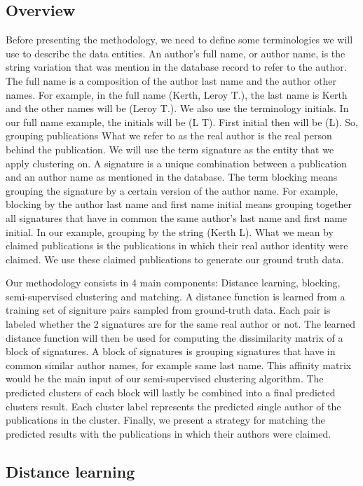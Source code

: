 \documentclass{article}
\begin{document}
\subsection{Overview}
Before presenting the methodology, we need to define some terminologies we will use to describe the data entities. An author's full name, or author name, is the string variation that was mention in the database record to refer to the author. The full name is a composition of the author last name and the author other names. For example, in the full name (Kerth, Leroy T.), the last name is Kerth and the other names will be (Leroy T.). We also use the terminology initials. In our full name example, the initials will be (L T). First initial then will be (L). So, grouping publications  What we refer to as the real author is the real person behind the publication. We will use the term signature as the entity that we apply clustering on.  A signature is a unique combination between a publication and an author name as mentioned in the database. The term blocking means grouping the signature by a certain version of the author name. For example, blocking by the author last name and first name initial means grouping together all signatures that have in common the same author's last name and first name initial. In our example, grouping by the string (Kerth L). What we mean by claimed publications is the publications in which their real author identity were claimed. We use these claimed publications to generate our ground truth data.

Our methodology consists in 4 main components: Distance learning, blocking, semi-supervised clustering and matching. A distance function is learned from a training set of signiture pairs sampled from ground-truth data. Each pair is labeled whether the 2 signatures are for the same real author or not. The learned distance function will then be used for computing the dissimilarity matrix of a block of signatures. A block of signatures is grouping signatures that have in common similar author names, for example same last name. This affinity matrix would be the main input of our semi-supervised clustering algorithm. The predicted clusters of each block will lastly be combined into a final predicted clusters result. Each cluster label represents the predicted single author of the publications in the cluster. Finally, we present a strategy for matching the predicted results with the publications in which their authors were claimed.

\subsection{Distance learning}
\end{document}
